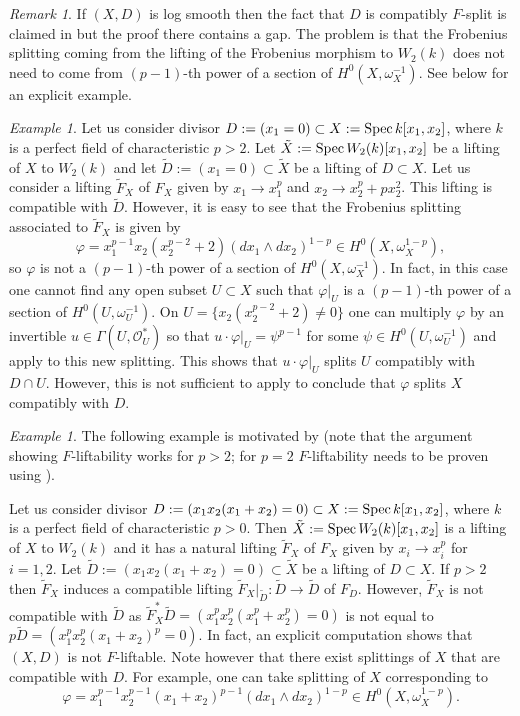 \documentclass[12pt]{article}
\theoremstyle{plain}
\theoremstyle{definition}
\theoremstyle{remark}
\newtheorem{Remark}[Thm]{Remark}
\newtheorem{Example}[Thm]{Example}
\newcommand{\cO}{{\mathcal O}}
\newcommand{\Spec}{{\mathop{{\rm Spec\, }}}}
\begin{document}
\begin{Remark}
	If $(X,D)$ is log smooth then the fact that $D$ is compatibly $F$-split is claimed in
	\cite[Lemma 3.1]{AWZ2} but the proof there contains a gap. 
	The problem is that the Frobenius splitting coming from the lifting of the Frobenius morphism to $W_2(k)$ does not need to come from $(p-1)$-th power of a section of $H^0(X, \omega_X^{-1})$. 
See below for an explicit example.	
\end{Remark}

\begin{Example}
Let us consider divisor $D:=(x_1=0)\subset X:=\Spec k[x_1,x_2]$, where $k$ is a perfect field of characteristic $p>2$. Let $\tilde X:=\Spec W_2(k)[x_1,x_2]$ be a lifting of $X$ to $W_2(k)$
and let $\tilde D:=(x_1=0)\subset \tilde X$ be a lifting of $D\subset X$.
Let us consider a lifting $\tilde F_X$ of $F_X$ given by $x_1\to x_1^p$ and $x_2\to x_2^p+px_2^2$. This lifting is compatible with $\tilde D$. However, it is easy to see that the Frobenius splitting associated to $\tilde F_X$ is given by 
 $$\varphi=x_1^{p-1}x_2(x_2^{p-2}+2)(dx_1\wedge dx_2)^{1-p}\in H^0(X, \omega _X^{1-p}),$$
so $\varphi$ is not  a $(p-1)$-th power of a section of $H^0(X, \omega_X^{-1})$. In fact, in this case one cannot find any open subset $U\subset X$ such that  $\varphi|_U$ is a $(p-1)$-th power of a section of $H^0(U, \omega_U^{-1})$. On $U=\{x_2(x_2^{p-2}+2)\ne 0\}$ one can multiply $\varphi$ by an invertible $u\in \Gamma (U, \cO_U^*)$ so that $u\cdot \varphi|_U=\psi ^{p-1}$ for some $\psi \in H^0(U, \omega_U^{-1})$ and apply \cite[Proposition 1.3.11]{BK} to this new splitting.
This shows that $u\cdot \varphi|_U$ splits $U$ compatibly with $D\cap U$. However, this is not sufficient to apply \cite[Lemma 1.1.7, (ii)]{BK} to conclude that $\varphi $ splits $X$ compatibly with $D$.
\end{Example}

\medskip

\begin{Example}
	The following example is motivated by \cite[Example 5.1]{Zd} (note that the argument showing $F$-liftability works for $p>2$;  for $p=2$ $F$-liftability needs to be proven using \cite[Corollary 4.12]{Zd}).
	
	Let us consider divisor $D:=(x_1x_2(x_1+x_2)=0)\subset X:=\Spec k[x_1,x_2]$, where $k$ is a perfect field of characteristic $p>0$. Then $\tilde X:=\Spec W_2(k)[x_1,x_2]$ is a lifting of $X$ to $W_2(k)$ and it has a natural  lifting $\tilde F_X$ of $F_X$
	given by $x_i\to x_i^p$ for $i=1,2$. Let $\tilde D:=(x_1x_2(x_1+x_2)=0)\subset \tilde X$ be a lifting of $D\subset X$. If $p>2$ then $\tilde F _X$ induces a compatible lifting $\tilde F_X|_{\tilde D}: \tilde D\to \tilde D$ of $F_D$. However,  $\tilde F_X$ {is not compatible with} $\tilde D$ as $\tilde F_X^*\tilde D=(x_1^px_2^p(x_1^p+x_2^p)=0)$ is not equal to $p\tilde D=(x_1^px_2^p(x_1+x_2)^p=0)$.
	In fact, an explicit computation shows that $(X, D)$ is not $F$-liftable. Note however that there exist splittings of $X$ that are compatible with $D$. For example, one can take splitting of $X$ corresponding to 
	$$\varphi=x_1^{p-1}x_2^{p-1}(x_1+x_2)^{p-1}(dx_1\wedge dx_2)^{1-p}\in H^0(X, \omega _X^{1-p}).$$
\end{Example}
\end{document}

